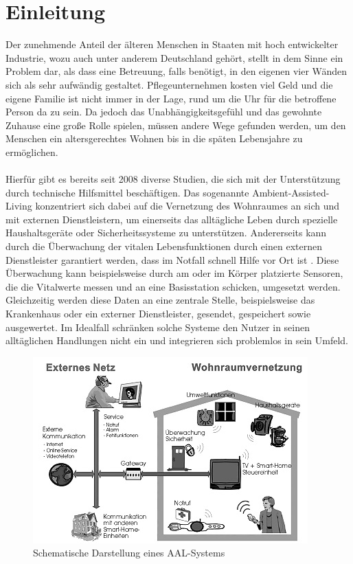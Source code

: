 \section{Einleitung}
\label{sec:Einleitung}
Der zunehmende Anteil der älteren Menschen in Staaten mit hoch entwickelter Industrie, wozu auch unter anderem Deutschland gehört, stellt in dem Sinne ein Problem dar, als dass eine Betreuung, falls benötigt, in den eigenen vier Wänden sich als sehr aufwändig gestaltet. Pflegeunternehmen kosten viel Geld und die eigene Familie ist nicht immer in der Lage, rund um die Uhr für die betroffene Person da zu sein. Da jedoch das Unabhängigkeitsgefühl und das gewohnte Zuhause eine große Rolle spielen, müssen andere Wege gefunden werden, um den Menschen ein altersgerechtes Wohnen bis in die späten Lebensjahre zu ermöglichen.
\\
\\
Hierfür gibt es bereits seit 2008 diverse Studien, die sich mit der Unterstützung durch technische Hilfsmittel beschäftigen. Das sogenannte \glqq Ambient-Assisted-Living\grqq \cite{aal} konzentriert sich dabei auf die Vernetzung des Wohnraumes an sich und mit externen Dienstleistern, um einerseits das alltägliche Leben durch spezielle Haushaltsgeräte oder Sicherheitssysteme zu unterstützen. Andererseits kann durch die Überwachung der vitalen Lebensfunktionen durch einen externen Dienstleister garantiert werden, dass im Notfall schnell Hilfe vor Ort ist \cite{aaltm}. Diese Überwachung kann beispielsweise durch am oder im Körper platzierte Sensoren, die die Vitalwerte messen und an eine Basisstation schicken, umgesetzt werden. Gleichzeitig werden diese Daten an eine zentrale Stelle, beispielsweise das Krankenhaus oder ein externer Dienstleister, gesendet, gespeichert sowie ausgewertet. Im Idealfall schränken solche Systeme den Nutzer in seinen alltäglichen Handlungen nicht ein und integrieren sich problemlos in sein Umfeld.

\begin{figure}[h]
\begin{center}
\includegraphics[scale=0.9]{images/intelligente-vernetzung.jpg} 
\caption{Schematische Darstellung eines AAL-Systems}
\end{center}
\end{figure}

